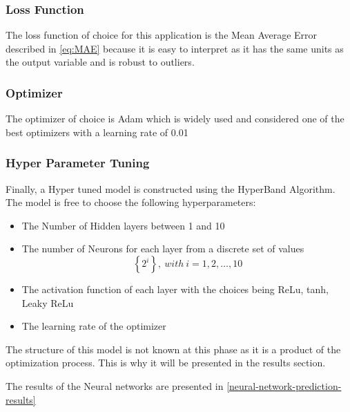 \subsubsection{Loss Function}

The loss function of choice for this application is the Mean Average
Error described in \autoref{eq:MAE} because it is easy to
interpret as it has the same units as the output variable and is robust
to outliers.

\subsubsection{Optimizer}

The optimizer of choice is Adam which is widely used and considered one
of the best optimizers with a learning rate of 0.01

\subsubsection{Hyper Parameter Tuning}
\label{Hyper-Parameter-Tuning}

Finally, a Hyper tuned model is constructed using the HyperBand
Algorithm. The model is free to choose the following hyperparameters:

\begin{itemize}
\item
  The Number of Hidden layers between 1 and 10
\item
  The number of Neurons for each layer from a discrete set of values
  \[\left\{ 2^{i} \right\}, \ with\ i = 1,2,\ldots ,10\]
\item
  The activation function of each layer with the choices being ReLu,
  tanh, Leaky ReLu
\item
  The learning rate of the optimizer
\end{itemize}

The structure of this model is not known at this phase as it is a
product of the optimization process. This is why it will be presented in
the results section.

The results of the Neural networks are presented in \autoref{neural-network-prediction-results}